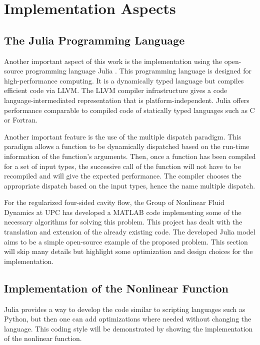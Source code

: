 
\section{Implementation Aspects} \label{sec:impl}

\subsection{The Julia Programming Language}

Another important aspect of this work is the implementation using the
open-source programming language Julia \citep{bezanson2017}. This programming
language is designed for high-performance computing. It is a dynamically typed
language but compiles efficient code via LLVM. The LLVM compiler infrastructure
gives a code language-intermediated representation that is
platform-independent. Julia offers performance comparable to compiled code of
statically typed languages such as C or Fortran.

Another important feature is the use of the multiple dispatch paradigm. This
paradigm allows a function to be dynamically dispatched based on the run-time
information of the function's arguments. Then, once a function has been
compiled for a set of input types, the successive call of the function will not
have to be recompiled and will give the expected performance. The compiler
chooses the appropriate dispatch based on the input types, hence the name
multiple dispatch.

For the regularized four-sided cavity flow, the Group of Nonlinear Fluid
Dynamics at UPC has developed a MATLAB code implementing some of the necessary
algorithms for solving this problem. This project has dealt with the
translation and extension of the already existing code. The developed Julia
model aims to be a simple open-source example of the proposed problem. This
section will skip many details but highlight some optimization and design
choices for the implementation.

\subsection{Implementation of the Nonlinear Function}

Julia provides a way to develop the code similar to scripting languages such as
Python, but then one can add optimizations where needed without changing the
language. This coding style will be demonstrated by showing the implementation
of the nonlinear function. 

